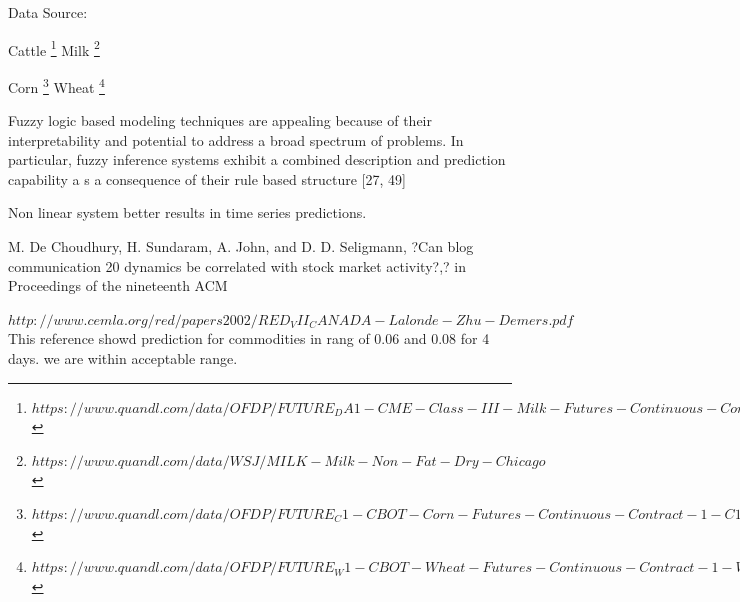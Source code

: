 Data Source: 

Cattle \footnote{$https://www.quandl.com/data/OFDP/FUTURE_DA1-CME-Class-III-Milk-Futures-Continuous-Contract-1-DA1-Front-Month$}
Milk \footnote{$https://www.quandl.com/data/WSJ/MILK-Milk-Non-Fat-Dry-Chicago$}

Corn \footnote{$https://www.quandl.com/data/OFDP/FUTURE_C1-CBOT-Corn-Futures-Continuous-Contract-1-C1-Front-Month$}
Wheat \footnote{$https://www.quandl.com/data/OFDP/FUTURE_W1-CBOT-Wheat-Futures-Continuous-Contract-1-W1-Front-Month$}







Fuzzy logic based modeling techniques are appealing because of their interpretability and potential to address a broad spectrum of problems. In particular, fuzzy inference systems exhibit a combined description and prediction capability a s a consequence of their rule based structure [27, 49]

Non linear system better results in time series predictions. 

M. De Choudhury, H. Sundaram, A. John, and D. D. Seligmann, ?Can blog communication 
20
dynamics be correlated with stock market activity?,? in Proceedings of the nineteenth ACM 




$http://www.cemla.org/red/papers2002/RED_VII_CANADA-Lalonde-Zhu-Demers.pdf$ This reference showd prediction for commodities in rang of 0.06 and 0.08 for 4 days. we are within acceptable range. 


 
